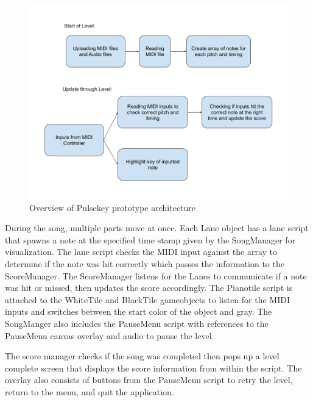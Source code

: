 \documentclass[10pt,twocolumn]{article}
\begin{document}
\begin{figure}
    \centering
    \includegraphics[width=.95\linewidth]{CS Comps Architecture.png}
    \caption{
       Overview of Pulsekey prototype architecture 
    }
    \label{fig:first-page}
\end{figure}

During the song, multiple parts move at once. Each Lane object has a lane script that spawns a note at the specified time stamp given by the SongManager for visualization. The lane script checks the MIDI input against the array to determine if the note was hit correctly which passes the information to the ScoreManager. The ScoreManager listens for the Lanes to communicate if a note was hit or missed, then updates the score accordingly. The Pianotile script is attached to the WhiteTile and BlackTile gameobjects to listen for the MIDI inputs and switches between the start color of the object and gray. The SongManger also includes the PauseMenu script with references to the PauseMenu canvas overlay and audio to pause the level.

The score manager checks if the song was completed then pops up a level complete screen that displays the score information from within the script. The overlay also consists of buttons from the PauseMenu script to retry the level, return to the menu, and quit the application.
\end{document}
